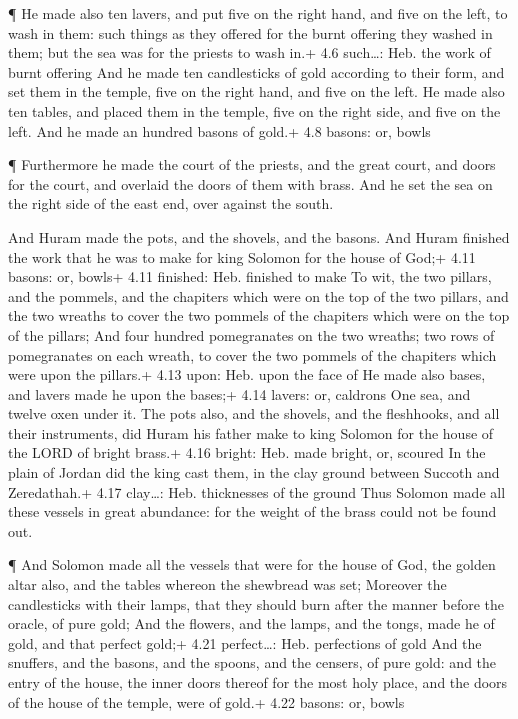  ¶ He made also ten lavers, and put five on the right hand,
and five on the left, to wash in them: such things as they offered for
the burnt offering they washed in them; but the sea was for the priests
to wash in.+ 4.6 such\ldots: Heb. the work of burnt offering
 And he made ten candlesticks of gold according to their
form, and set them in the temple, five on the right hand, and five on
the left.  He made also ten tables, and placed them in the
temple, five on the right side, and five on the left. And he made an
hundred basons of gold.+ 4.8 basons: or, bowls

 ¶ Furthermore he made the court of the priests, and the
great court, and doors for the court, and overlaid the doors of them
with brass.  And he set the sea on the right side of the
east end, over against the south.

 And Huram made the pots, and the shovels, and the basons.
And Huram finished the work that he was to make for king Solomon for the
house of God;+ 4.11 basons: or, bowls+ 4.11 finished: Heb. finished to
make  To wit, the two pillars, and the pommels, and the
chapiters which were on the top of the two pillars, and the two wreaths
to cover the two pommels of the chapiters which were on the top of the
pillars;  And four hundred pomegranates on the two wreaths;
two rows of pomegranates on each wreath, to cover the two pommels of the
chapiters which were upon the pillars.+ 4.13 upon: Heb. upon the face of
 He made also bases, and lavers made he upon the bases;+
4.14 lavers: or, caldrons  One sea, and twelve oxen under
it.  The pots also, and the shovels, and the fleshhooks,
and all their instruments, did Huram his father make to king Solomon for
the house of the LORD of bright brass.+ 4.16 bright: Heb. made bright,
or, scoured  In the plain of Jordan did the king cast them,
in the clay ground between Succoth and Zeredathah.+ 4.17 clay\ldots:
Heb. thicknesses of the ground  Thus Solomon made all these
vessels in great abundance: for the weight of the brass could not be
found out.

 ¶ And Solomon made all the vessels that were for the house
of God, the golden altar also, and the tables whereon the shewbread was
set;  Moreover the candlesticks with their lamps, that they
should burn after the manner before the oracle, of pure gold;
 And the flowers, and the lamps, and the tongs, made he of
gold, and that perfect gold;+ 4.21 perfect\ldots: Heb. perfections of
gold  And the snuffers, and the basons, and the spoons, and
the censers, of pure gold: and the entry of the house, the inner doors
thereof for the most holy place, and the doors of the house of the
temple, were of gold.+ 4.22 basons: or, bowls


